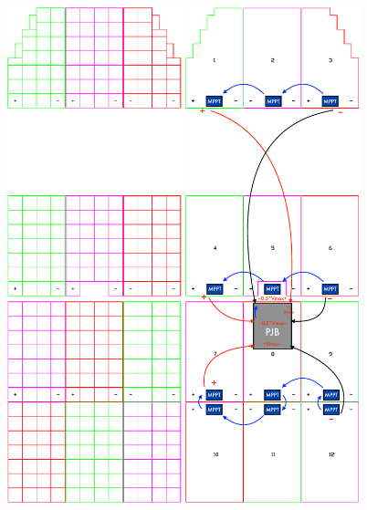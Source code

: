 \documentclass[10pt]{article}
\begin{document}
\begin{figure}[hbp]
\centering
\includegraphics[width=0.45\textwidth]{figures/array-cell-layout}
\hfill
\includegraphics[width=0.45\textwidth]{figures/array-mppt-layout}

\end{figure}
\end{document}

